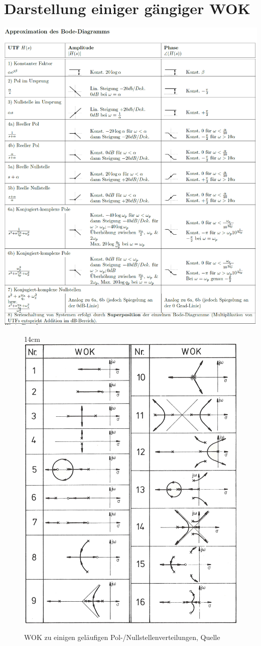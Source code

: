 \section{Darstellung einiger gängiger WOK}
\includegraphics[width=16cm]{./images/BodeAproximationen.png}
\clearpage
	\begin{figure}[h!]{14cm}
		\includegraphics[width=14cm]{./images/BilderWOK.png}
		\caption{WOK zu einigen geläufigen Pol-/Nullstellenverteilungen, Quelle}
	\end{figure}

